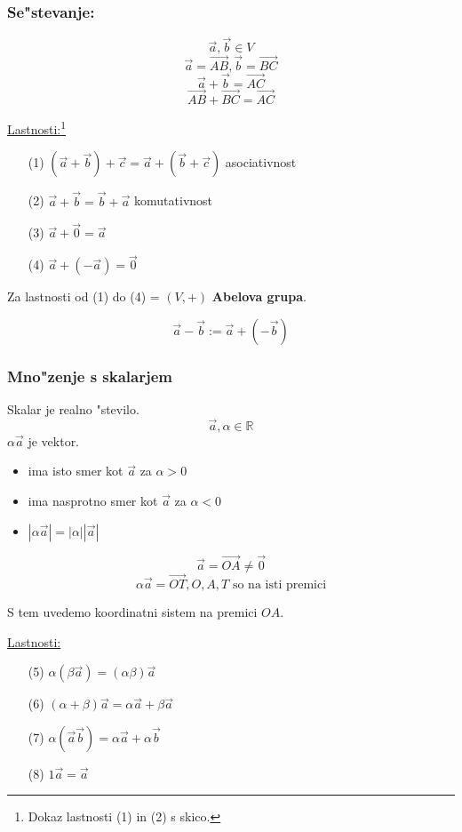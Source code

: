 \subsubsection*{Se"stevanje:}
\[\vec{a}, \vec{b} \in V\]
\[\vec{a} = \vec{AB}, \vec{b} = \vec{BC}\]
\[\vec{a} + \vec{b} = \vec{AC}\]
\[\vec{AB} + \vec{BC} = \vec{AC}\]

\underline{Lastnosti:}\footnote{Dokaz lastnosti (1) in (2) s skico.}
\begin{itemize}
	\item[(1)] \((\vec{a} + \vec{b}) + \vec{c} = \vec{a} + (\vec{b} + \vec{c})\) asociativnost
	\item[(2)] \(\vec{a} + \vec{b} = \vec{b} + \vec{a}\) komutativnost
	\item[(3)] \(\vec{a} + \vec{0} = \vec{a}\)
	\item[(4)] \(\vec{a} + (-\vec{a}) = \vec{0}\)
\end{itemize}

Za lastnosti od (1) do (4) = \((V, +)\) \textbf{Abelova grupa}.

\[\vec{a} - \vec{b} := \vec{a} + (-\vec{b})\]

\subsubsection*{Mno"zenje s skalarjem}
Skalar je realno "stevilo.
\[\vec{a}, \alpha \in \mathbb{R}\]
\(\alpha \vec{a}\) je vektor.
\begin{itemize}
	\item ima isto smer kot \(\vec{a}\) za \(\alpha > 0\)
	\item ima nasprotno smer kot \(\vec{a}\) za \(\alpha < 0\)
	\item \(|\alpha \vec{a}| = |\alpha| |\vec{a}|\)
\end{itemize}

\[\vec{a} = \vec{OA} \neq \vec{0}\]
\[\alpha \vec{a} = \vec{OT}, O, A, T \text{ so na isti premici} \]

S tem uvedemo koordinatni sistem na premici \(OA\).

\underline{Lastnosti:}
\begin{itemize}
	\item[(5)] \(\alpha (\beta \vec{a}) = (\alpha \beta) \vec{a}\)
	\item[(6)] \((\alpha + \beta) \vec{a} = \alpha \vec{a} + \beta \vec{a} \)
	\item[(7)] \(\alpha(\vec{a} \vec{b}) = \alpha \vec{a} + \alpha \vec{b}\)
	\item[(8)] \(1\vec{a} = \vec{a}\)
\end{itemize}

